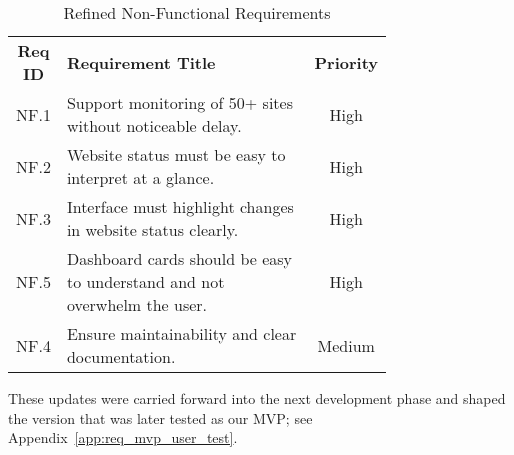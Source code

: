 \begin{table}[H]
    \centering
    \caption{Refined Non-Functional Requirements}
    \label{tab:nonfunctional_reqs_refined}
    \begin{tabular}{|c|>{\raggedright\arraybackslash}p{0.75\linewidth}|c|}
        \hline
        \textbf{Req ID} & \textbf{Requirement Title} & \textbf{Priority} \\
 NF.1& Support monitoring of 50+ sites without noticeable delay.&High\\\hline
        \hline
        NF.2& Website status must be easy to interpret at a glance.& High \\
        \hline
        NF.3& Interface must highlight changes in website status clearly. & High \\ \hline 
 NF.5& Dashboard cards should be easy to understand and not overwhelm the user.&High\\
        \hline
        NF.4 & Ensure maintainability and clear documentation. & Medium \\\hline
    \end{tabular}
\end{table}

\bigskip
\noindent
These updates were carried forward into the next development phase and shaped the version that was later tested as our MVP; see Appendix~\ref{app:req_mvp_user_test}.